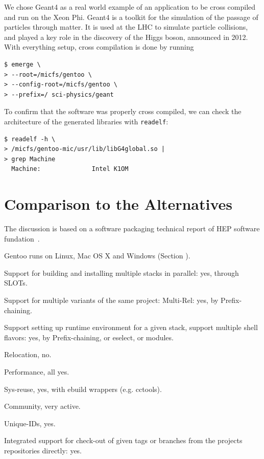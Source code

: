\documentclass[a4paper,conference]{IEEEtran}
\begin{document}
We chose Geant4 as a real world example of an application to be cross
compiled and run on the Xeon Phi. Geant4 is a toolkit for the
simulation of the passage of particles through matter. It is used at the
LHC to simulate particle collisions, and played a key role in the
discovery of the Higgs boson, announced in 2012. With everything setup,
cross compilation is done by running
\begin{verbatim}
$ emerge \
> --root=/micfs/gentoo \
> --config-root=/micfs/gentoo \
> --prefix=/ sci-physics/geant
\end{verbatim}

To confirm that the software was properly cross compiled, we can check
the architecture of the generated libraries with \verb|readelf|:
\begin{verbatim}
$ readelf -h \
> /micfs/gentoo-mic/usr/lib/libG4global.so |
> grep Machine
  Machine:              Intel K1OM
\end{verbatim}

\section{Comparison to the Alternatives}
The discussion is based on a software packaging technical report of
HEP software fundation~\cite{hsf:package}.

Gentoo runs on Linux, Mac OS X and Windows
(Section \label{sec:portage}).

Support for building and installing multiple stacks in parallel:
yes, through SLOTs.

Support for multiple variants of the same project: Multi-Rel: yes,
by Prefix-chaining.

Support setting up runtime environment for a given stack, support
multiple shell flavors: yes, by Prefix-chaining, or eselect, or
modules.

Relocation, no.

Performance, all yes.

Sys-reuse, yes, with ebuild wrappers (e.g. cctools).

Community, very active.

Unique-IDs, yes.

Integrated support for check-out of given tags or branches from the
projects repositories directly: yes.



\end{document}
